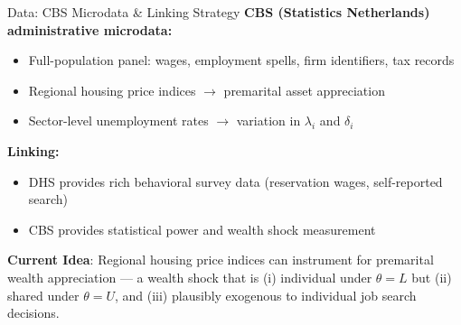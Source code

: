 \documentclass[aspectratio=169, 11pt]{beamer}
\begin{document}
\begin{frame}{Data: CBS Microdata \& Linking Strategy}
\textbf{CBS (Statistics Netherlands) administrative microdata:}
\begin{itemize}
  \item Full-population panel: wages, employment spells, firm identifiers, tax records
  \item Regional housing price indices $\rightarrow$ premarital asset appreciation
  \item Sector-level unemployment rates $\rightarrow$ variation in $\lambda_i$ and $\delta_i$
\end{itemize}
\vspace{1.5em}
\textbf{Linking:}
\begin{itemize}
  \item DHS provides rich behavioral survey data (reservation wages, self-reported search)
  \item CBS provides statistical power and wealth shock measurement
\end{itemize}
\vspace{0.6em}
\small
\textbf{Current Idea}: Regional housing price indices can instrument for premarital wealth appreciation — a wealth shock that is (i) individual under $\theta = L$ but (ii) shared under $\theta = U$, and (iii) plausibly exogenous to individual job search decisions.
\end{frame}

\end{document}
